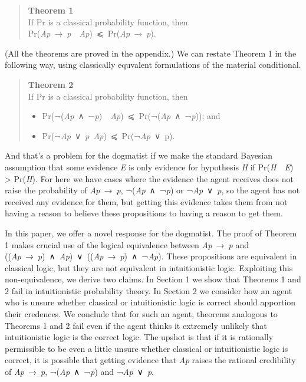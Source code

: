 \documentclass[
  10pt,
  letterpaper,
  DIV=11,
  numbers=noendperiod,
  twoside]{scrartcl}
\providecommand{\tightlist}{%
  \setlength{\itemsep}{0pt}\setlength{\parskip}{0pt}}\usepackage{longtable,booktabs,array}
\begin{document}
\begin{quote}
\textbf{Theorem 1}\\
If Pr is a classical probability function, then\\
Pr(\emph{Ap}~→~\emph{p}~\textbar~\emph{Ap})~⩽~Pr(\emph{Ap}~→~\emph{p}).
\end{quote}

(All the theorems are proved in the appendix.) We can restate Theorem 1
in the following way, using classically equvalent formulations of the
material conditional.

\begin{quote}
\textbf{Theorem 2}\\
If Pr is a classical probability function, then

\begin{itemize}
\tightlist
\item
  Pr(¬(\emph{Ap}~∧~¬\emph{p})~\textbar~\emph{Ap})~⩽~Pr(¬(\emph{Ap}~∧~¬\emph{p}));
  and
\item
  Pr(¬\emph{Ap}~∨~\emph{p}\textbar~\emph{Ap})~⩽~Pr(¬\emph{Ap}~∨~p).
\end{itemize}
\end{quote}

And that's a problem for the dogmatist if we make the standard Bayesian
assumption that some evidence \emph{E} is only evidence for hypothesis
\emph{H} if Pr(\emph{H}~\textbar~\emph{E}) \textgreater{} Pr(\emph{H}).
For here we have cases where the evidence the agent receives does not
raise the probability of \emph{Ap}~→~\emph{p}, ¬(\emph{Ap}~∧~¬\emph{p})
or ¬\emph{Ap}~∨~\emph{p}, so the agent has not received any evidence for
them, but getting this evidence takes them from not having a reason to
believe these propositions to having a reason to get them.

In this paper, we offer a novel response for the dogmatist. The proof of
Theorem 1 makes crucial use of the logical equivalence between
\emph{Ap}~→~\emph{p} and
((\emph{Ap}~→~\emph{p})~∧~\emph{Ap})~∨~((\emph{Ap}~→~\emph{p})~∧~¬\emph{Ap}).
These propositions are equivalent in classical logic, but they are not
equivalent in intuitionistic logic. Exploiting this non-equivalence, we
derive two claims. In Section 1 we show that Theorems 1 and 2 fail in
intuitionistic probability theory. In Section 2 we consider how an agent
who is unsure whether classical or intuitionistic logic is correct
should apportion their credences. We conclude that for such an agent,
theorems analogous to Theorems 1 and 2 fail even if the agent thinks it
extremely unlikely that intuitionistic logic is the correct logic. The
upshot is that if it is rationally permissible to be even a little
unsure whether classical or intuitionistic logic is correct, it is
possible that getting evidence that \emph{Ap} raises the rational
credibility of \emph{Ap}~→~\emph{p}, ¬(\emph{Ap}~∧~¬\emph{p}) and
¬\emph{Ap}~∨~\emph{p}.
\end{document}
